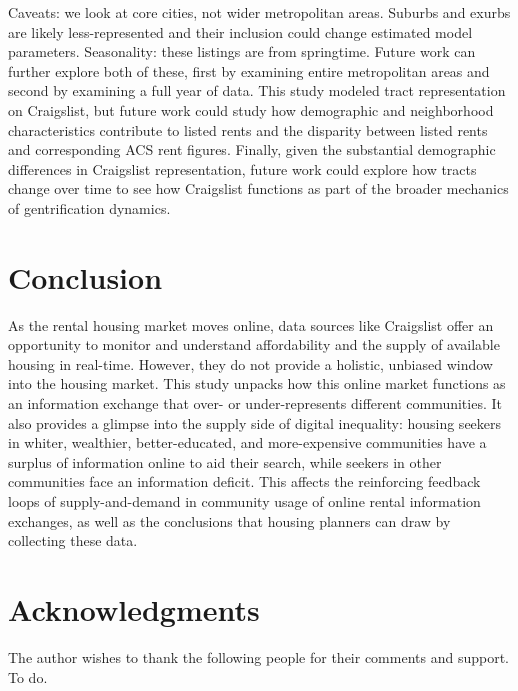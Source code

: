 \documentclass[12pt,onecolumn]{article} %
\begin{document}
Caveats: we look at core cities, not wider metropolitan areas. Suburbs and exurbs are likely less-represented and their inclusion could change estimated model parameters. Seasonality: these listings are from springtime. Future work can further explore both of these, first by examining entire metropolitan areas and second by examining a full year of data. This study modeled tract representation on Craigslist, but future work could study how demographic and neighborhood characteristics contribute to listed rents and the disparity between listed rents and corresponding ACS rent figures. Finally, given the substantial demographic differences in Craigslist representation, future work could explore how tracts change over time to see how Craigslist functions as part of the broader mechanics of gentrification dynamics.

\section{Conclusion}

As the rental housing market moves online, data sources like Craigslist offer an opportunity to monitor and understand affordability and the supply of available housing in real-time. However, they do not provide a holistic, unbiased window into the housing market. This study unpacks how this online market functions as an information exchange that over- or under-represents different communities. It also provides a glimpse into the supply side of digital inequality: housing seekers in whiter, wealthier, better-educated, and more-expensive communities have a surplus of information online to aid their search, while seekers in other communities face an information deficit. This affects the reinforcing feedback loops of supply-and-demand in community usage of online rental information exchanges, as well as the conclusions that housing planners can draw by collecting these data.



\section*{Acknowledgments}

The author wishes to thank the following people for their comments and support. To do.


\setlength{\bibsep}{0.00cm plus 0.05cm} %


\end{document}
